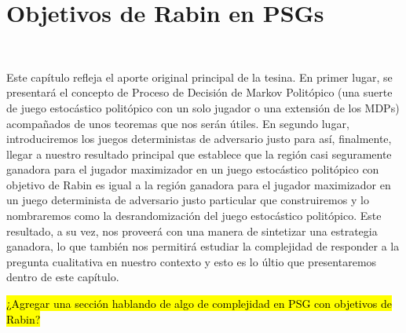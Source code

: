 \chapter{Objetivos de Rabin en PSGs}
~\label{cap:results}

Este capítulo refleja el aporte original principal de la tesina. En primer
lugar, se presentará el concepto de Proceso de Decisión de Markov Politópico
(una suerte de juego estocástico politópico con un solo jugador o una extensión
de los MDPs) acompañados de unos teoremas que nos serán útiles. En segundo
lugar, introduciremos los juegos deterministas de adversario justo para así,
finalmente, llegar a nuestro resultado principal que establece que la región
casi seguramente ganadora para el jugador maximizador en un juego estocástico
politópico con objetivo de Rabin es igual a la región ganadora para el jugador
maximizador en un juego determinista de adversario justo particular que
construiremos y lo nombraremos como la desrandomización del juego estocástico
politópico. Este resultado, a su vez, nos proveerá con una manera de sintetizar
una estrategia ganadora, lo que también nos permitirá estudiar la complejidad
de responder a la pregunta cualitativa en nuestro contexto y esto es lo últio
que presentaremos dentro de este capítulo.





\hl{¿Agregar una sección hablando de algo de complejidad en PSG con objetivos de Rabin?}

